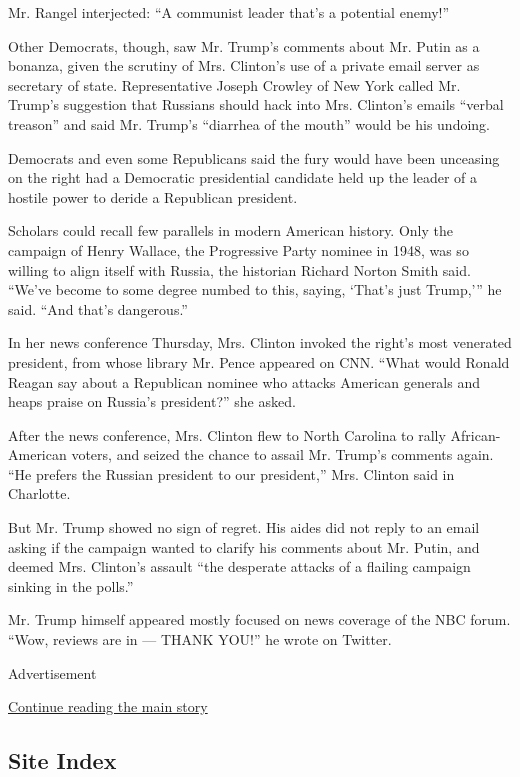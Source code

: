 Mr. Rangel interjected: ``A communist leader that's a potential enemy!''

Other Democrats, though, saw Mr. Trump's comments about Mr. Putin as a
bonanza, given the scrutiny of Mrs. Clinton's use of a private email
server as secretary of state. Representative Joseph Crowley of New York
called Mr. Trump's suggestion that Russians should hack into Mrs.
Clinton's emails ``verbal treason'' and said Mr. Trump's ``diarrhea of
the mouth'' would be his undoing.

Democrats and even some Republicans said the fury would have been
unceasing on the right had a Democratic presidential candidate held up
the leader of a hostile power to deride a Republican president.

Scholars could recall few parallels in modern American history. Only the
campaign of Henry Wallace, the Progressive Party nominee in 1948, was so
willing to align itself with Russia, the historian Richard Norton Smith
said. ``We've become to some degree numbed to this, saying, `That's just
Trump,''' he said. ``And that's dangerous.''

In her news conference Thursday, Mrs. Clinton invoked the right's most
venerated president, from whose library Mr. Pence appeared on CNN.
``What would Ronald Reagan say about a Republican nominee who attacks
American generals and heaps praise on Russia's president?'' she asked.

After the news conference, Mrs. Clinton flew to North Carolina to rally
African-American voters, and seized the chance to assail Mr. Trump's
comments again. ``He prefers the Russian president to our president,''
Mrs. Clinton said in Charlotte.

But Mr. Trump showed no sign of regret. His aides did not reply to an
email asking if the campaign wanted to clarify his comments about Mr.
Putin, and deemed Mrs. Clinton's assault ``the desperate attacks of a
flailing campaign sinking in the polls.''

Mr. Trump himself appeared mostly focused on news coverage of the NBC
forum. ``Wow, reviews are in --- THANK YOU!'' he wrote on Twitter.

Advertisement

\protect\hyperlink{after-bottom}{Continue reading the main story}

\hypertarget{site-index}{%
\subsection{Site Index}\label{site-index}}


